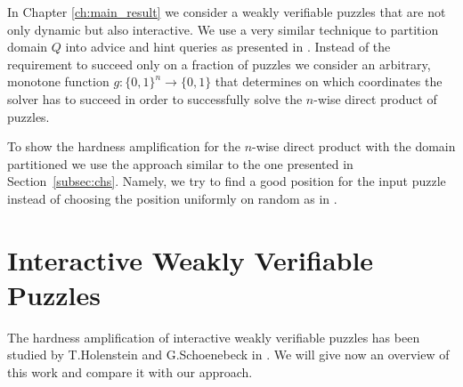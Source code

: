 In Chapter \ref{ch:main_result} we consider a weakly verifiable puzzles that are not only dynamic but also interactive.
We use a very similar technique to partition domain $Q$ into advice and hint queries as presented in \cite{Dodis:2009:SAI:1530441.1530450}.
Instead of the requirement to succeed only on a fraction of puzzles we consider an arbitrary, monotone function $g : \{0,1\}^{n} \rightarrow \{0,1\}$
that determines on which coordinates the solver has to succeed in order to successfully solve the $n$-wise direct product of puzzles.

To show the hardness amplification for the $n$-wise direct product with the domain partitioned we use
the approach similar to the one presented in Section~\ref{subsec:chs}. Namely, we try to find a good position for the input puzzle instead of
choosing the position uniformly on random as in \cite{Dodis:2009:SAI:1530441.1530450}.

\section{Interactive Weakly Verifiable Puzzles}
\label{section:iwvp}
%
The hardness amplification of interactive weakly verifiable puzzles has been studied by T.Holenstein and G.Schoenebeck in \cite{DBLP:journals/corr/abs-1002-3534}.
We will give now an overview of this work and compare it with our approach.

